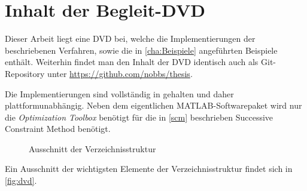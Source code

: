 
\chapter{Inhalt der Begleit-DVD} %
\label{cha:inhalt_der_begleit_dvd}

Dieser Arbeit liegt eine DVD bei, welche die Implementierungen der beschriebenen Verfahren, sowie die in \autoref{cha:Beispiele} angeführten Beispiele enthält.
Weiterhin findet man den Inhalt der DVD identisch auch als Git-Repository unter \url{https://github.com/nobbs/thesis}.

Die Implementierungen sind vollständig in \textcite{Matlab} gehalten und daher plattformunabhängig.
Neben dem eigentlichen MATLAB-Softwarepaket wird nur die \emph{Optimization Toolbox} benötigt für die in \autoref{scm} beschrieben Successive Constraint Method benötigt.

\begin{figure}[tb]
    \caption{Ausschnitt der Verzeichnisstruktur}
    \label{fig:dvd}
\end{figure}

Ein Ausschnitt der wichtigsten Elemente der Verzeichnisstruktur findet sich in \autoref{fig:dvd}.



